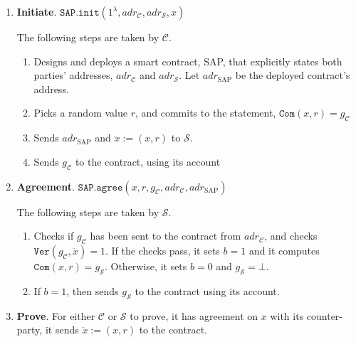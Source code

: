  \begin{enumerate}
 
 \item\textbf{Initiate}. $\mathtt{SAP.init}(1^{\scriptscriptstyle\lambda}, adr_{\scriptscriptstyle\mathcal{C}}, adr_{\scriptscriptstyle\mathcal{S}},x )$ 
 

  
 The following steps are taken   by  $\mathcal C$.
 
  \begin{enumerate}
  \item  Designs and deploys a smart contract, SAP, that  explicitly states both parties'  addresses, $adr_{\scriptscriptstyle\mathcal{C}}$ and  $adr_{\scriptscriptstyle\mathcal{S}}$. Let $adr_{\scriptscriptstyle\text{SAP}}$ be the deployed contract's address. 

   \item  Picks a random value $r$, and commits to the statement, $\mathtt{Com}(x,r)=g_{\scriptscriptstyle \mathcal{C}}$
   \item Sends $adr_{\scriptscriptstyle\text{SAP}}$ and $\ddot{x}:=(x,r)$  to  $\mathcal S$. 
   \item Sends $g_{\scriptscriptstyle\mathcal C}$ to the contract, using its account 
    \end{enumerate}
    
    \item\textbf{Agreement}. $\mathtt{SAP.agree}(x,r,g_{\scriptscriptstyle \mathcal{C}},adr_{\scriptscriptstyle\mathcal{C}},adr_{\scriptscriptstyle\text{SAP}})$

    
     The following steps are taken   by  $\mathcal S$.
     
     \begin{enumerate}
 
   \item Checks if $g_{\scriptscriptstyle \mathcal{C}}$ has been sent to the contract from $adr_{\scriptscriptstyle \mathcal{C}}$, and checks $\mathtt{Ver}(g_{\scriptscriptstyle\mathcal C}, \ddot{x})=1$. If the checks pass, it sets $b=1$ and   it computes $\mathtt{Com}(x,r)=g_{\scriptscriptstyle\mathcal S}$. Otherwise, it sets $b=0$ and $g_{\scriptscriptstyle\mathcal S}=\bot$.
   
   \item  If $b=1$, then sends $g_{\scriptscriptstyle\mathcal S}$ to the contract using its account.
    \end{enumerate}
   \item\textbf{Prove}. For either $\mathcal C$ or $\mathcal S$ to prove, it has agreement on $x$ with its counter-party, it sends $\ddot{x}:=(x, r)$  to the contract. 
   

\end{enumerate}
